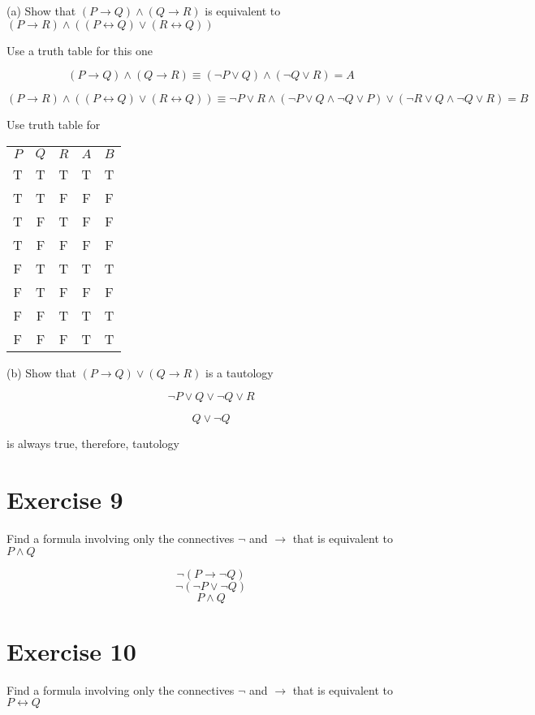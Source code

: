 \documentclass[11pt]{article}
\newcommand{\then}{\rightarrow}
\newcommand{\bicond}{\leftrightarrow}
\begin{document}
\noindent (a) Show that $(P \then Q) \wedge (Q \then R)$ is equivalent to 
$(P \then R) \wedge ((P \bicond Q) \vee (R \bicond Q))$

Use a truth table for this one 

$$(P \then Q) \wedge (Q \then R) \equiv (\neg P \vee Q) \wedge (\neg Q \vee R) = A$$

$$
    (P \then R) \wedge ((P \bicond Q) \vee (R \bicond Q)) 
    \equiv 
    \neg P \vee R \wedge (\neg P \vee Q \wedge \neg Q \vee P) \vee (\neg R \vee Q \wedge \neg Q \vee R)
    = B
$$

Use truth table for

\begin{center}
\begin{tabular}{ c c c c c }
    $P$ & $Q$ & $R$ & $A$ & $B$ \\ 
T & T & T & T & T\\  
T & T & F & F & F\\
T & F & T & F & F\\  
T & F & F & F & F\\
F & T & T & T & T\\  
F & T & F & F & F\\
F & F & T & T & T\\  
F & F & F & T & T\\
\end{tabular}
\end{center}

\noindent (b) Show that $(P \then Q) \vee (Q \then R)$ is a tautology

$$\neg P \vee Q \vee \neg Q \vee R$$

$$Q \vee \neg Q$$ 

is always true, therefore, tautology

\section*{Exercise 9}

\noindent Find a formula involving only the connectives $\neg$ and $\then$ that 
is equivalent to $P \wedge Q$

$$\neg (P \then \neg Q)$$
$$\neg (\neg P \vee \neg Q)$$
$$P \wedge Q$$

\section*{Exercise 10}

\noindent Find a formula involving only the connectives $\neg$ and $\then$ that 
is equivalent to $P \bicond Q$
\end{document}
